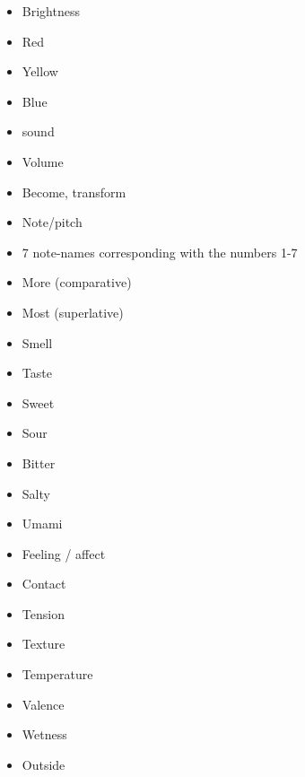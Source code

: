 \documentclass[a5,landscape]{article}
\begin{document}
{\begin{multicols}{4}
\begin{itemize}
\item   Brightness 

\item   Red 

\item   Yellow 

\item   Blue 

\item   sound 

\item   Volume 

\item   Become, transform 

\item   Note/pitch 

\item   7 note-names corresponding with the numbers 1-7 

\item   More (comparative)  

\item   Most (superlative) 

\item   Smell 

\item   Taste 

\item   Sweet 

\item   Sour 

\item   Bitter 

\item   Salty 

\item   Umami 

\item   Feeling / affect 

\item   Contact 

\item   Tension 

\item   Texture 

\item   Temperature 

\item   Valence 

\item   Wetness 

\item   Outside 


\end{itemize}
\end{multicols}}
\end{document}
